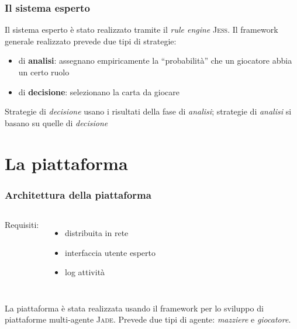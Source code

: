 \documentclass{beamer}
\newcommand*\lista{\item[$\diamondsuit$]}
\begin{document}


\begin{frame}
   \frametitle{Il sistema esperto}
   Il sistema esperto è stato realizzato tramite il \emph{rule engine} \textsc{Jess}.
   \vfill
   \pause
   Il framework generale realizzato prevede due tipi di strategie:
   \begin{itemize}
      \lista di \textbf{analisi}: assegnano empiricamente la ``probabilità'' che un giocatore abbia un certo ruolo
      \lista di \textbf{decisione}: selezionano la carta da giocare
   \end{itemize}
   \vfill
   \pause
   Strategie di \emph{decisione} usano i risultati della fase di \emph{analisi}; strategie di \emph{analisi} si basano su quelle di \emph{decisione}


\end{frame}


\section{La piattaforma}

\begin{frame}
   \frametitle{Architettura della piattaforma}
   \begin{columns}

   Requisiti:
   \begin{itemize}
      \lista distribuita in rete
      \lista interfaccia utente esperto
      \lista log attività
   \end{itemize}



   \begin{center}
   \begin{figure}      
   \end{figure}
   \end{center}

   \end{columns}
   
   \vfill
   \pause

   La piattaforma è stata realizzata usando il framework per lo sviluppo di piattaforme multi-agente \textsc{Jade}.
   \vfill
   Prevede due tipi di agente: \emph{mazziere} e \emph{giocatore}.
   \vfill

\end{frame}
\end{document}
